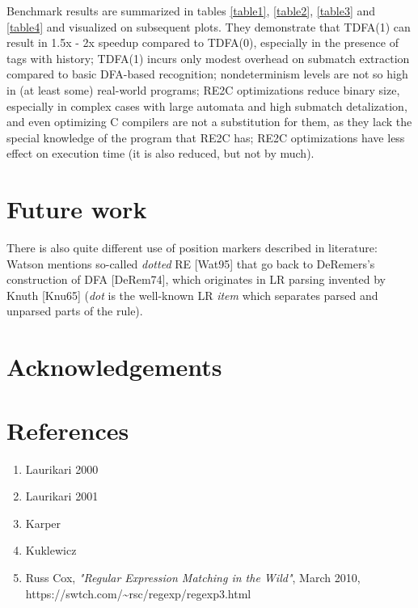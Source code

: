 \documentclass{article}
\theoremstyle{definition}
\begin{document}
\begin{multicols}{2}
Benchmark results are summarized in tables \ref{table1}, \ref{table2}, \ref{table3} and \ref{table4}
and visualized on subsequent plots.
They demonstrate that TDFA(1) can result in 1.5x - 2x speedup compared to TDFA(0), especially in the presence of tags with history;
TDFA(1) incurs only modest overhead on submatch extraction compared to basic DFA-based recognition;
nondeterminism levels are not so high in (at least some) real-world programs;
RE2C optimizations reduce binary size, especially in complex cases with large automata and high submatch detalization,
and even optimizing C compilers are not a substitution for them, as they lack the special knowledge of the program that RE2C has;
RE2C optimizations have less effect on execution time (it is also reduced, but not by much).

\section{Future work}\label{section_future_work}

There is also quite different use of position markers described in literature:
Watson mentions so-called \emph{dotted} RE [Wat95]
that go back to DeRemers's construction of DFA [DeRem74],
which originates in LR parsing invented by Knuth [Knu65]
(\emph{dot} is the well-known LR \emph{item} which separates parsed and unparsed parts of the rule).

\section*{Acknowledgements}

\end{multicols}
\pagebreak

\section*{References}

\begin{enumerate}
\item Laurikari 2000
\item Laurikari 2001
\item Karper
\item Kuklewicz

    \item \! [Cox10] Russ Cox, \textit{"Regular Expression Matching in the Wild"}, March 2010, \\
        https://swtch.com/\textasciitilde rsc/regexp/regexp3.html

\end{enumerate}
\end{document}
